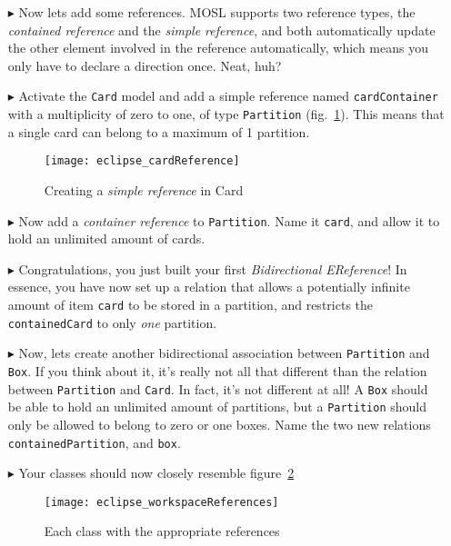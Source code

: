 \begin{itemize}
\item[$\blacktriangleright$] Now lets add some references. MOSL supports two reference types, the \emph{contained reference} and the \emph{simple reference}, and both automatically update the other element involved in the reference automatically, which means you only have to declare a direction once. Neat, huh?

\item[$\blacktriangleright$] Activate the \texttt{Card} model and add a simple reference named \texttt{cardContainer} with a multiplicity of zero to one, of type \texttt{Partition} (fig.~\ref{fig:cardReference}). This means that a single card can belong to a maximum of 1 partition.

\begin{figure}[htbp]
	\centering
  \texttt{[image: eclipse\_cardReference]}
	\caption{Creating a \emph{simple reference} in Card}
	\label{fig:cardReference}
\end{figure} 

\item[$\blacktriangleright$] Now add a \emph{container reference} to \texttt{Partition}. Name it \texttt{card}, and allow it to hold an unlimited amount of cards.

\item[$\blacktriangleright$] Congratulations, you just built your first \emph{Bidirectional EReference}! In essence, you have now set up a relation that allows a potentially infinite amount of item \texttt{card} to be stored in a partition, and restricts the \texttt{containedCard} to only \emph{one} partition.

\item[$\blacktriangleright$] Now, lets create another bidirectional association between \texttt{Partition} and \texttt{Box}. If you think about it, it's really not all that different than the relation between \texttt{Partition} and \texttt{Card}. In fact, it's not different at all! A \texttt{Box} should be able to hold an unlimited amount of partitions, but a \texttt{Partition} should only be allowed to belong to zero or one boxes. Name the two new relations \texttt{containedPartition}, and \texttt{box}. 

\item[$\blacktriangleright$] Your classes should now closely resemble figure~\ref{fig:allReferences}


\begin{figure}[htbp]
	\centering
  \texttt{[image: eclipse\_workspaceReferences]}
	\caption{Each class with the appropriate references}
	\label{fig:allReferences}
\end{figure} 



\end{itemize}
